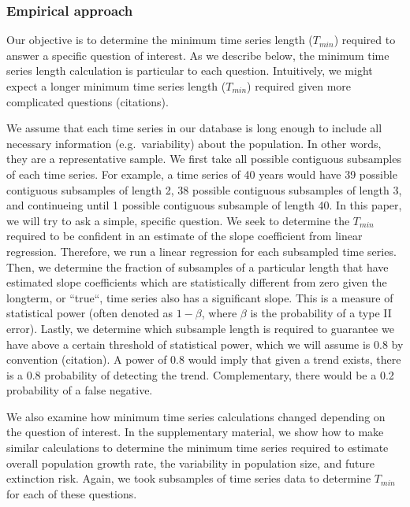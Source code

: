 \documentclass[12pt,]{article}
\begin{document}
\subsubsection{Empirical approach}\label{empirical-approach}

Our objective is to determine the minimum time series length
(\(T_{min}\)) required to answer a specific question of interest. As we
describe below, the minimum time series length calculation is particular
to each question. Intuitively, we might expect a longer minimum time
series length (\(T_{min}\)) required given more complicated questions
(citations).

We assume that each time series in our database is long enough to
include all necessary information (e.g.~variability) about the
population. In other words, they are a representative sample. We first
take all possible contiguous subsamples of each time series. For
example, a time series of 40 years would have 39 possible contiguous
subsamples of length 2, 38 possible contiguous subsamples of length 3,
and continueing until 1 possible contiguous subsample of length 40. In
this paper, we will try to ask a simple, specific question. We seek to
determine the \(T_{min}\) required to be confident in an estimate of the
slope coefficient from linear regression. Therefore, we run a linear
regression for each subsampled time series. Then, we determine the
fraction of subsamples of a particular length that have estimated slope
coefficients which are statistically different from zero given the
longterm, or ``true``, time series also has a significant slope. This is
a measure of statistical power (often denoted as \(1- \beta\), where
\(\beta\) is the probability of a type II error). Lastly, we determine
which subsample length is required to guarantee we have above a certain
threshold of statistical power, which we will assume is 0.8 by
convention (citation). A power of 0.8 would imply that given a trend
exists, there is a 0.8 probability of detecting the trend.
Complementary, there would be a 0.2 probability of a false negative.

We also examine how minimum time series calculations changed depending
on the question of interest. In the supplementary material, we show how
to make similar calculations to determine the minimum time series
required to estimate overall population growth rate, the variability in
population size, and future extinction risk. Again, we took subsamples
of time series data to determine \(T_{min}\) for each of these
questions.
\end{document}
